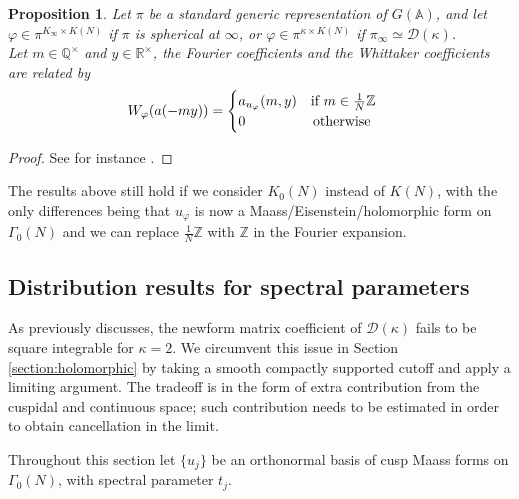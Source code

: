 \documentclass{article}
\newtheorem{proposition}[theorem]{Proposition}
\numberwithin{equation}{section}
\begin{document}
\begin{proposition} Let $\pi$ be a standard generic representation of $G(\mathbb{A})$, and let $\varphi \in \pi^{K_\infty\times K(N)}$ if $\pi$ is spherical at $\infty$, or $\varphi \in \pi^{\kappa\times K(N)}$ if $\pi_\infty\simeq \mathcal{D}(\kappa)$.\\
Let $m \in\mathbb{Q}^\times$ and $y \in \mathbb{R}^\times$, the Fourier coefficients and the Whittaker coefficients are related by
    \begin{equation}\label{eq:whittaker-fourier}
        W_\varphi(a(-my))=\begin{cases}
            a_{u_\varphi}(m,y) \quad \text{if } m \in \frac{1}{N}\mathbb{Z} \\
            0 \hspace{1.7cm} \text{otherwise}
        \end{cases}
    \end{equation}
\end{proposition}
\begin{proof}
    See for instance \cite[Lemma 3.6]{Gelbart}.
\end{proof}
The results above still hold if we consider $K_0(N)$ instead of $K(N)$, with the only differences being that $u_\varphi$ is now a Maass/Eisenstein/holomorphic form on $\Gamma_0(N)$ and we can replace $\tfrac{1}{N}\mathbb{Z}$ with $\mathbb{Z}$ in the Fourier expansion. \bigbreak

\subsection{Distribution results for spectral parameters}
As previously discusses, the newform matrix coefficient of $\mathcal{D}(\kappa)$ fails to be square integrable for $\kappa=2$. We circumvent this issue in Section \ref{section:holomorphic} by taking a smooth compactly supported cutoff and apply a limiting argument. The tradeoff is in the form of extra contribution from the cuspidal and continuous space; such contribution needs to be estimated in order to obtain cancellation in the limit.

Throughout this section let $\{u_j\}$ be an orthonormal basis of cusp Maass forms on $\Gamma_0(N)$, with spectral parameter $t_j$.
\end{document}
